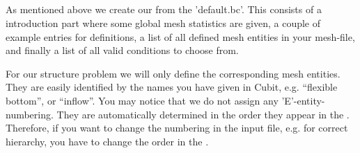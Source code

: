 \subsection{\bc}
As mentioned above we create our \bc from the 'default.bc'. This consists of a
introduction part where some global mesh statistics are given, a couple of
example entries for definitions, a list of all defined mesh entities in
your mesh-file, and finally a list of all valid \baci{} conditions to choose
from.

For our structure problem we will only define the corresponding mesh entities. They are easily identified by the names you have given in Cubit, e.g. ``flexible bottom'', or ``inflow''. You may notice that we do not assign any 'E'-entity-numbering.
They are automatically determined in the order they appear in the \bc. Therefore, if you want to change the numbering in the \baci{} input file, e.g. for correct hierarchy, you have to change the order in the \bc.

